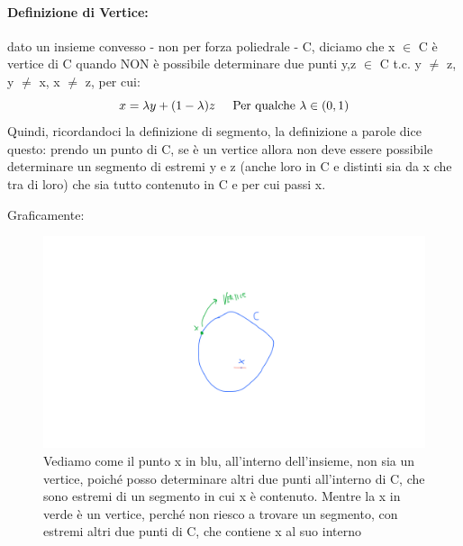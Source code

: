 \paragraph{Definizione di Vertice:} dato un insieme convesso - non per forza poliedrale - C, diciamo che x $\in$ C è vertice di C quando NON è possibile determinare due punti y,z $\in$ C t.c. y $\neq$ z, y $\neq$ x, x $\neq$ z, per cui:
\begin{equation*}
    x = \lambda y + (1 - \lambda)z \hspace{0.5cm} \text{Per qualche $\lambda \in (0,1)$}
\end{equation*}
Quindi, ricordandoci la definizione di segmento, la definizione a parole dice questo: prendo un punto di C, se è un vertice allora non deve essere possibile determinare un segmento di estremi y e z (anche loro in C e distinti sia da x che tra di loro) che sia tutto contenuto in C e per cui passi x.


\newpage 

Graficamente: 
\begin{figure}[h!]
    \centering
    \includegraphics[scale=0.5]{vertice.png}
    \caption{Vediamo come il punto x in blu, all'interno dell'insieme, non sia un vertice, poiché posso determinare altri due punti all'interno di C, che sono estremi di un segmento in cui x è contenuto. Mentre la x in verde è un vertice, perché non riesco a trovare un segmento, con estremi altri due punti di C, che contiene x al suo interno} 
\end{figure}

